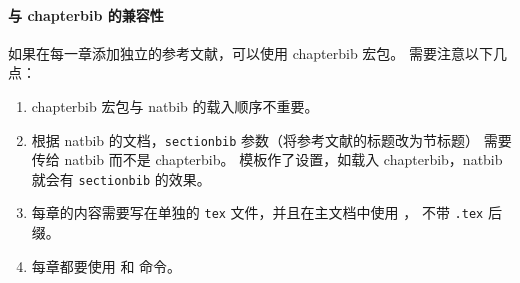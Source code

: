 \documentclass[a4paper]{ltxdoc}
\DeclareRobustCommand\file{\nolinkurl}
\DeclareRobustCommand\pkg{\textsf}
\DeclareRobustCommand\opt{\texttt}
\begin{document}
\paragraph{与 \pkg{chapterbib} 的兼容性}
如果在每一章添加独立的参考文献，可以使用 \pkg{chapterbib} 宏包。
需要注意以下几点：
\begin{enumerate}
  \item \pkg{chapterbib} 宏包与 \pkg{natbib} 的载入顺序不重要。
  \item 根据 \pkg{natbib} 的文档，\opt{sectionbib} 参数（将参考文献的标题改为节标题）
    需要传给 \pkg{natbib} 而不是 \pkg{chapterbib}。
    模板作了设置，如载入 \pkg{chapterbib}，\pkg{natbib} 就会有 \opt{sectionbib} 的效果。
  \item 每章的内容需要写在单独的 \file{tex} 文件，并且在主文档中使用 ，
    不带 \file{.tex} 后缀。
  \item 每章都要使用  和  命令。
\end{enumerate}
\end{document}
